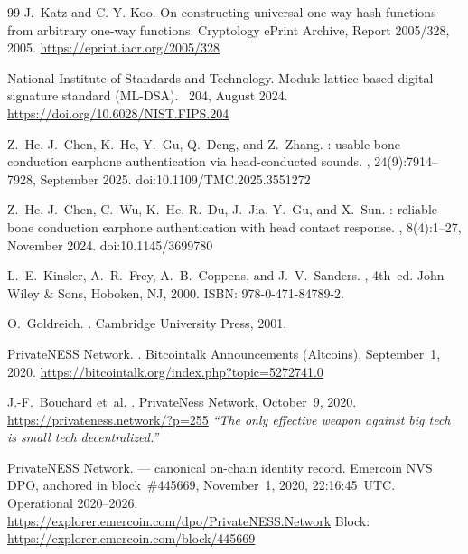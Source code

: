 \documentclass[11pt,a4paper]{article}
\theoremstyle{definition}
\begin{document}
\begin{thebibliography}{99}
J.~Katz and C.-Y. Koo.
\newblock On constructing universal one-way hash functions from
  arbitrary one-way functions.
\newblock Cryptology ePrint Archive, Report 2005/328, 2005.
\newblock \url{https://eprint.iacr.org/2005/328}

{National Institute of Standards and Technology}.
\newblock Module-lattice-based digital signature standard ({ML-DSA}).
~204, August 2024.
\newblock \url{https://doi.org/10.6028/NIST.FIPS.204}

Z.~He, J.~Chen, K.~He, Y.~Gu, Q.~Deng, and Z.~Zhang.
: usable bone conduction earphone authentication
  via head-conducted sounds.
,
  24(9):7914--7928, September 2025.
\newblock doi:10.1109/TMC.2025.3551272

Z.~He, J.~Chen, C.~Wu, K.~He, R.~Du, J.~Jia, Y.~Gu, and X.~Sun.
: reliable bone conduction earphone
  authentication with head contact response.
, 8(4):1--27, November 2024.
\newblock doi:10.1145/3699780

L.~E.~Kinsler, A.~R.~Frey, A.~B.~Coppens, and J.~V.~Sanders.
, 4th~ed.
\newblock John Wiley \& Sons, Hoboken, NJ, 2000.
\newblock ISBN: 978-0-471-84789-2.

O.~Goldreich.
.
\newblock Cambridge University Press, 2001.

{PrivateNESS Network}.
.
\newblock Bitcointalk Announcements (Altcoins), September~1, 2020.
\newblock \url{https://bitcointalk.org/index.php?topic=5272741.0}

J.-F.~Bouchard et~al.
.
\newblock PrivateNess Network, October~9, 2020.
\newblock \url{https://privateness.network/?p=255}
\newblock \textit{``The only effective weapon against big tech is
  small tech decentralized.''}

{PrivateNESS Network}.
 --- canonical on-chain identity
  record.
\newblock Emercoin NVS DPO, anchored in block~\#445669,
  November~1, 2020, 22:16:45~UTC. Operational 2020--2026.
\newblock \url{https://explorer.emercoin.com/dpo/PrivateNESS.Network}
\newblock Block: \url{https://explorer.emercoin.com/block/445669}

\end{thebibliography}
\end{document}
